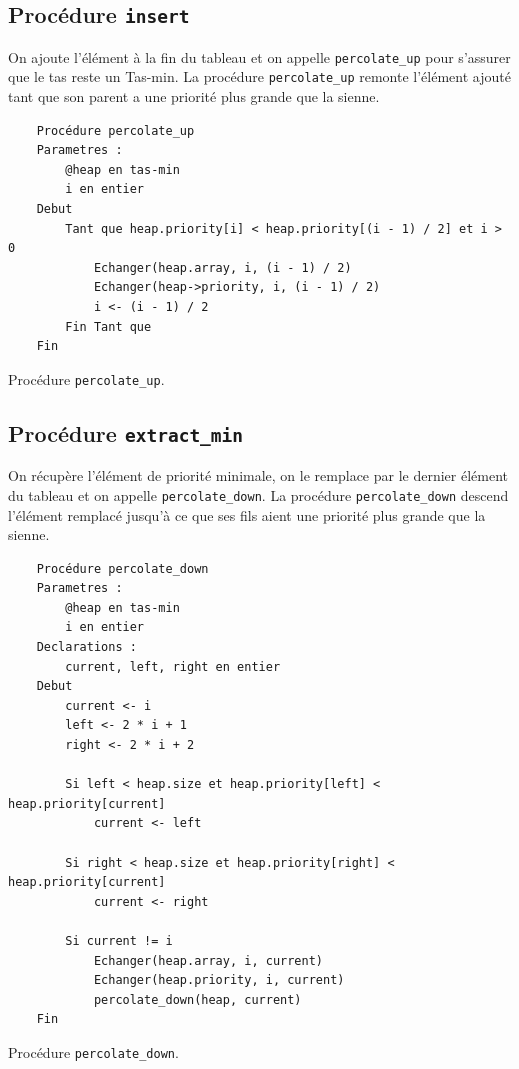 \subsection{Procédure \texttt{insert}}

On ajoute l'élément à la fin du tableau et on appelle \texttt{percolate\_up} pour s'assurer que le tas reste un Tas-min.
La procédure \texttt{percolate\_up} remonte l'élément ajouté tant que son parent a une priorité plus grande que la sienne.

\begin{listing}[!htpb]
    \begin{verbatim}
    Procédure percolate_up
    Parametres :
        @heap en tas-min
        i en entier
    Debut
        Tant que heap.priority[i] < heap.priority[(i - 1) / 2] et i > 0
            Echanger(heap.array, i, (i - 1) / 2)
            Echanger(heap->priority, i, (i - 1) / 2)
            i <- (i - 1) / 2
        Fin Tant que
    Fin
    \end{verbatim}
    \caption{Procédure \texttt{percolate\_up}.}
    \label{listing:percolate_up}
\end{listing}

\subsection{Procédure \texttt{extract\_min}}

On récupère l'élément de priorité minimale, on le remplace par le dernier élément du tableau et on appelle \texttt{percolate\_down}.
La procédure \texttt{percolate\_down} descend l'élément remplacé jusqu'à ce que ses fils aient une priorité plus grande que la sienne.

\begin{longlisting}
    \begin{verbatim}
    Procédure percolate_down
    Parametres :
        @heap en tas-min
        i en entier
    Declarations :
        current, left, right en entier
    Debut
        current <- i
        left <- 2 * i + 1
        right <- 2 * i + 2

        Si left < heap.size et heap.priority[left] < heap.priority[current]
            current <- left
        
        Si right < heap.size et heap.priority[right] < heap.priority[current]
            current <- right
        
        Si current != i
            Echanger(heap.array, i, current)
            Echanger(heap.priority, i, current)
            percolate_down(heap, current)
    Fin
    \end{verbatim}
    \caption{Procédure \texttt{percolate\_down}.}
    \label{listing:percolate_down}
\end{longlisting}

